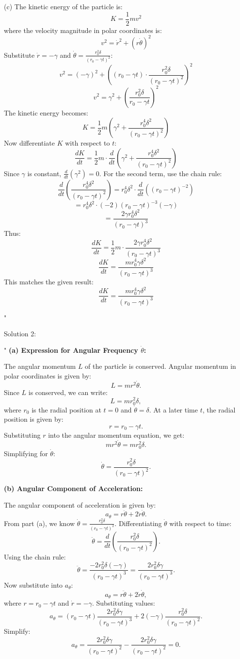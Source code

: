 (c) The kinetic energy of the particle is:
\[
K = \frac{1}{2} m v^2
\]
where the velocity magnitude in polar coordinates is:
\[
v^2 = \dot{r}^2 + (r \dot{\theta})^2
\]
Substitute \( \dot{r} = -\gamma \) and \( \dot{\theta} = \frac{r_0^2 \delta}{(r_0 - \gamma t)^2} \):
\[
v^2 = (-\gamma)^2 + \left( (r_0 - \gamma t) \cdot \frac{r_0^2 \delta}{(r_0 - \gamma t)^2} \right)^2
\]
\[
v^2 = \gamma^2 + \left( \frac{r_0^2 \delta}{r_0 - \gamma t} \right)^2
\]
The kinetic energy becomes:
\[
K = \frac{1}{2} m \left( \gamma^2 + \frac{r_0^4 \delta^2}{(r_0 - \gamma t)^2} \right)
\]
Now differentiate \( K \) with respect to \( t \):
\[
\frac{dK}{dt} = \frac{1}{2} m \cdot \frac{d}{dt} \left( \gamma^2 + \frac{r_0^4 \delta^2}{(r_0 - \gamma t)^2} \right)
\]
Since \( \gamma \) is constant, \( \frac{d}{dt}(\gamma^2) = 0 \). For the second term, use the chain rule:
\[
\frac{d}{dt} \left( \frac{r_0^4 \delta^2}{(r_0 - \gamma t)^2} \right) = r_0^4 \delta^2 \cdot \frac{d}{dt} \left( (r_0 - \gamma t)^{-2} \right)
\]
\[
= r_0^4 \delta^2 \cdot (-2)(r_0 - \gamma t)^{-3}(-\gamma)
\]
\[
= \frac{2 \gamma r_0^4 \delta^2}{(r_0 - \gamma t)^3}
\]
Thus:
\[
\frac{dK}{dt} = \frac{1}{2} m \cdot \frac{2 \gamma r_0^4 \delta^2}{(r_0 - \gamma t)^3}
\]
\[
\frac{dK}{dt} = \frac{m r_0^4 \gamma \delta^2}{(r_0 - \gamma t)^3}
\]
This matches the given result:
\[
\boxed{\frac{dK}{dt} = \frac{m r_0^4 \gamma \delta^2}{(r_0 - \gamma t)^3}}
\]

"

Solution 2: 

"
\textbf{(a) Expression for Angular Frequency \( \dot{\theta} \):}

The angular momentum \( L \) of the particle is conserved. Angular momentum in polar coordinates is given by:
\[
L = m r^2 \dot{\theta}.
\]
Since \( L \) is conserved, we can write:
\[
L = m r_0^2 \delta,
\]
where \( r_0 \) is the radial position at \( t = 0 \) and \( \dot{\theta} = \delta \). At a later time \( t \), the radial position is given by:
\[
r = r_0 - \gamma t.
\]
Substituting \( r \) into the angular momentum equation, we get:
\[
m r^2 \dot{\theta} = m r_0^2 \delta.
\]
Simplifying for \( \dot{\theta} \):
\[
\dot{\theta} = \frac{r_0^2 \delta}{(r_0 - \gamma t)^2}.
\]

\textbf{(b) Angular Component of Acceleration:}

The angular component of acceleration is given by:
\[
a_\theta = r \ddot{\theta} + 2 \dot{r} \dot{\theta}.
\]
From part (a), we know \( \dot{\theta} = \frac{r_0^2 \delta}{(r_0 - \gamma t)^2} \). Differentiating \( \dot{\theta} \) with respect to time:
\[
\ddot{\theta} = \frac{d}{dt} \left( \frac{r_0^2 \delta}{(r_0 - \gamma t)^2} \right).
\]
Using the chain rule:
\[
\ddot{\theta} = \frac{-2 r_0^2 \delta (-\gamma)}{(r_0 - \gamma t)^3} = \frac{2 r_0^2 \delta \gamma}{(r_0 - \gamma t)^3}.
\]
Now substitute into \( a_\theta \):
\[
a_\theta = r \ddot{\theta} + 2 \dot{r} \dot{\theta},
\]
where \( r = r_0 - \gamma t \) and \( \dot{r} = -\gamma \). Substituting values:
\[
a_\theta = (r_0 - \gamma t) \frac{2 r_0^2 \delta \gamma}{(r_0 - \gamma t)^3} + 2(-\gamma) \frac{r_0^2 \delta}{(r_0 - \gamma t)^2}.
\]
Simplify:
\[
a_\theta = \frac{2 r_0^2 \delta \gamma}{(r_0 - \gamma t)^2} - \frac{2 r_0^2 \delta \gamma}{(r_0 - \gamma t)^2} = 0.
\]

